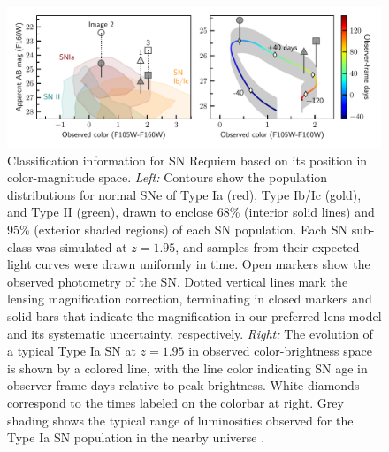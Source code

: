 \documentclass[12pt]{article}
\begin{document}
\clearpage
\begin{figure}
  \centering
    \includegraphics[draft=False, width=\textwidth]{Paper/Figures/classification_contours_timeline.pdf}
    \caption{Classification information for SN Requiem based on its position in color-magnitude space. \emph{Left:} Contours show the population distributions for normal SNe of Type Ia (red), Type Ib/Ic (gold), and Type II (green), drawn to enclose 68\% (interior solid lines) and 95\% (exterior shaded regions) of each SN population.  Each SN sub-class was simulated at $z=1.95$, and samples from their expected light curves were drawn uniformly in time. Open markers show the observed photometry of the SN. Dotted vertical lines mark the lensing magnification correction, terminating in closed markers and solid bars that indicate the magnification in our preferred lens model and its systematic uncertainty, respectively.  \emph{Right:} The evolution of a typical Type Ia SN at $z=1.95$ in observed color-brightness space is shown by a colored line, with the line color indicating SN age in observer-frame days relative to peak brightness.  White diamonds correspond to the times labeled on the colorbar at right. Grey shading shows the typical range of luminosities observed for the Type Ia SN population in the nearby universe \cite{wang_determination_2006}. 
    \label{fig:class}
    }
\end{figure}
\end{document}
